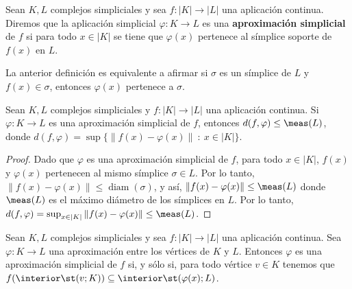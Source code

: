 \begin{definicion}
	Sean $K, L$ complejos simpliciales y sea $f: |K| \to |L|$ una aplicación continua. Diremos que la aplicación simplicial $\varphi: K \to L$ es una \textbf{aproximación simplicial} de $f$ si para todo $x \in |K|$ se tiene que $\varphi(x)$ pertenece al símplice soporte de $f(x)$ en $L$.
\end{definicion}
\begin{observacion}
	La anterior definición es equivalente a afirmar si $\sigma$ es un símplice de $L$ y $f(x) \in \sigma$, entonces $\varphi(x)$ pertenece a $\sigma$.
\end{observacion}

\begin{proposicion}
	\label{prop:dist-approx-simp}
	Sean \( K, L \) complejos simpliciales y \( f: |K| \to |L| \) una aplicación continua. Si \( \varphi: K \to L \) es una aproximación simplicial de \( f \), entonces \( d(f,\varphi) \leq \meas(L) \), donde \( d(f,\varphi) = \sup\{\|f(x) - \varphi(x)\|\ : \ x \in |K|\} \).
\end{proposicion}
\begin{proof}
	Dado que \( \varphi \) es una aproximación simplicial de \( f \), para todo \( x \in |K| \), \( f(x) \) y \( \varphi(x) \) pertenecen al mismo símplice \( \sigma \in L \). Por lo tanto, \( \|f(x) - \varphi(x)\| \leq \operatorname{diam}(\sigma) \), y así, \( \|f(x) - \varphi(x)\| \leq \meas(L) \) donde \( \meas(L) \) es el máximo diámetro de los símplices en \( L \). Por lo tanto, \( d(f,\varphi) = \sup_{x \in |K|} \|f(x) - \varphi(x)\| \leq \meas(L) \).
\end{proof}
\begin{proposicion}
	\label{prop:char-approx-simp}
	Sean $K, L$ complejos simpliciales y sea $f: |K| \to |L|$ una aplicación continua. Sea  $\varphi: K \to L$ una aproximación entre los vértices de $K$ y $L$. Entonces $\varphi$ es una aproximación simplicial de $f$ si, y sólo si, para todo vértice $v \in K$ tenemos que $f( \interior\st(v;K)) \subseteq \interior \st(\varphi(x);L)$.
\end{proposicion}
